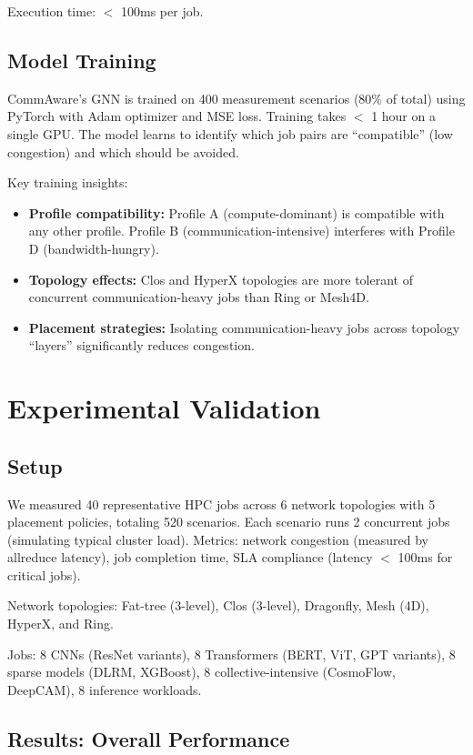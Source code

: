 \documentclass[conference]{IEEEtran}
\begin{document}
Execution time: $<$ 100ms per job.

\subsection{Model Training}

CommAware's GNN is trained on 400 measurement scenarios (80\% of total) using PyTorch with Adam optimizer and MSE loss. Training takes $<$ 1 hour on a single GPU. The model learns to identify which job pairs are ``compatible'' (low congestion) and which should be avoided.

Key training insights:

\begin{itemize}
\item \textbf{Profile compatibility:} Profile A (compute-dominant) is compatible with any other profile. Profile B (communication-intensive) interferes with Profile D (bandwidth-hungry).
\item \textbf{Topology effects:} Clos and HyperX topologies are more tolerant of concurrent communication-heavy jobs than Ring or Mesh4D.
\item \textbf{Placement strategies:} Isolating communication-heavy jobs across topology ``layers'' significantly reduces congestion.
\end{itemize}

\section{Experimental Validation}

\subsection{Setup}

We measured 40 representative HPC jobs across 6 network topologies with 5 placement policies, totaling 520 scenarios. Each scenario runs 2 concurrent jobs (simulating typical cluster load). Metrics: network congestion (measured by allreduce latency), job completion time, SLA compliance (latency $<$ 100ms for critical jobs).

Network topologies: Fat-tree (3-level), Clos (3-level), Dragonfly, Mesh (4D), HyperX, and Ring.

Jobs: 8 CNNs (ResNet variants), 8 Transformers (BERT, ViT, GPT variants), 8 sparse models (DLRM, XGBoost), 8 collective-intensive (CosmoFlow, DeepCAM), 8 inference workloads.

\subsection{Results: Overall Performance}
\end{document}
